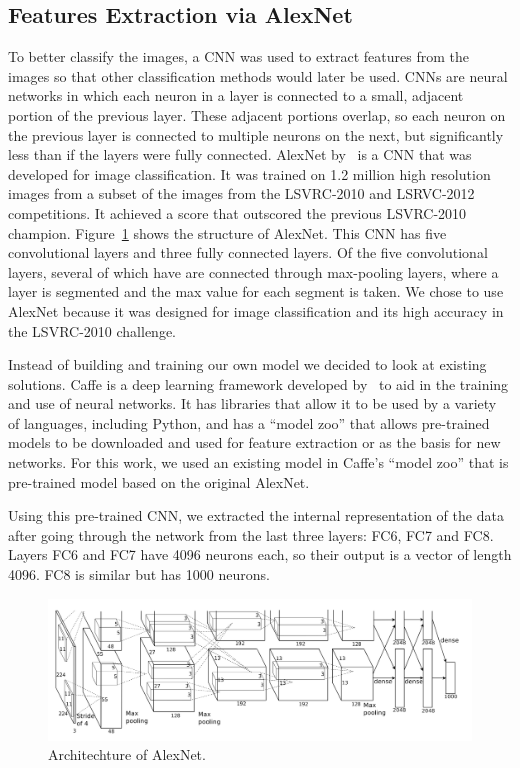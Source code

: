 \documentclass{article} %
\begin{document}
 
\subsection{Features Extraction via AlexNet}

To better classify the images, a CNN was used to extract features from the images so that other classification methods would later be used. CNNs are neural networks in which each neuron in a layer is connected to a small, adjacent portion of the previous layer. These adjacent portions overlap, so each neuron on the previous layer is connected to multiple neurons on the next, but significantly less than if the layers were fully connected. AlexNet by~\citet{krizhevsky2012imagenet} is a CNN that was developed for image classification. It was trained on 1.2 million high resolution images from a subset of the images from the LSVRC-2010 and LSRVC-2012 competitions. It achieved a score that outscored the previous LSVRC-2010 champion. Figure~\ref{fig:alexnet} shows the structure of AlexNet. This CNN has five convolutional layers and three fully connected layers. Of the five convolutional layers,  several of which have are connected through max-pooling layers, where a layer is segmented and the max value for each segment is taken. We chose to use AlexNet because it was designed for image classification and its high accuracy in the LSVRC-2010 challenge.

Instead of building and training our own model we decided to look at existing solutions. Caffe is a deep learning framework developed by~\citet{jia2014caffe} to aid in the training and use of neural networks. It has libraries that allow it to be used by a variety of languages, including Python, and has a ``model zoo'' that allows pre-trained models to be downloaded and used for feature extraction or as the basis for new networks. For this work, we used an existing model in Caffe's ``model zoo'' that is pre-trained model based on the original AlexNet.

Using this pre-trained CNN, we extracted the internal representation of the data after going through the network from the last three layers: FC6, FC7 and FC8. Layers FC6 and FC7 have 4096 neurons each, so their output is a vector of length 4096. FC8 is similar but has 1000 neurons.
\begin{figure}[h]
\centering
\includegraphics[width=\textwidth]{alexnet.png}
\caption{Architechture of AlexNet.}
\label{fig:alexnet}
\end{figure}
\end{document}
